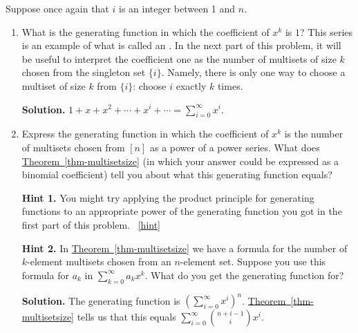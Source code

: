 \documentclass{book}
\begin{document}
\setcounter{project}{250}
\addtocounter{project}{-1}
\begin{activity}[]\label{activity-243}
\hypertarget{p-1332}{}%
Suppose once again that \(i\) is an integer between 1 and \(n\).%
\begin{enumerate}[font=\bfseries,label=(\alph*),ref=\alph*]
\item\label{task-245} \hypertarget{p-1333}{}%
What is the generating function in which the coefficient of \(x^k\) is \(1\)? This series is an example of what is called an . In the next part of this problem, it will be useful to interpret the coefficient one as the number of multisets of size \(k\) chosen from the singleton set \(\{i\}\). Namely, there is only one way to choose a multiset of size \(k\) from \(\{i\}\): choose \(i\) exactly \(k\) times.%
\par\smallskip%
\noindent\textbf{Solution.}\hypertarget{solution-160}{}\quad%
\hypertarget{p-1334}{}%
\(1+x+x^2+\cdots+x^i+\cdots=\sum_{i=0}^\infty x^i\).%
\item\label{task-246} \hypertarget{p-1335}{}%
Express the generating function in which the coefficient of \(x^k\) is the number of multisets chosen from \([n]\) as a power of a power series.  What does \hyperref[thm-multisetsize]{Theorem~\ref{thm-multisetsize}} (in which your answer could be expressed as a binomial coefficient) tell you about what this generating function equals?%
\par\smallskip%
\noindent\textbf{Hint 1.}\hypertarget{hint-159}{}\quad%
\hypertarget{p-1336}{}%
You might try applying the product principle for generating functions to an appropriate power of the generating function you got in the first part of this problem.%
~\hfill{\tiny\hyperlink{a-250.b}{[hint]}\hypertarget{q-250.b}{}}\par\smallskip%
\noindent\textbf{Hint 2.}\hypertarget{hint-160}{}\quad%
\hypertarget{p-1337}{}%
In \hyperref[thm-multisetsize]{Theorem~\ref{thm-multisetsize}} we have a formula for the number of \(k\)-element multisets chosen from an \(n\)-element set. Suppose you use this formula for \(a_k\) in \(\sum_{k=0}^\infty a_kx^k\). What do you get the generating function for?%
\par\smallskip%
\noindent\textbf{Solution.}\hypertarget{solution-161}{}\quad%
\hypertarget{p-1338}{}%
The generating function is \(\left(\sum_{i=0}^\infty x^i\right)^n\).  \hyperref[thm-multisetsize]{Theorem~\ref{thm-multisetsize}} tells us that this equals \(\sum_{i=0}^\infty\binom{n+i-1}{i}x^i\).%
\end{enumerate}
\end{activity}
\end{document}

